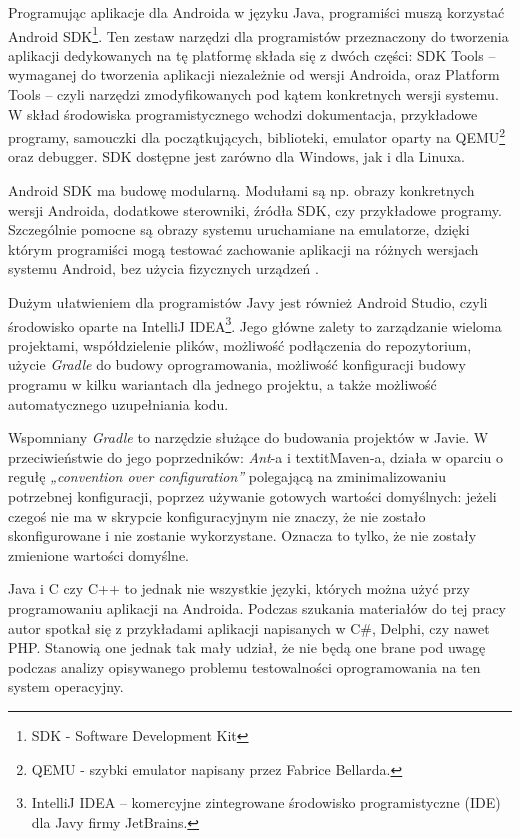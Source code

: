 Programując aplikacje dla Androida w języku Java, programiści muszą korzystać Android SDK\footnote{SDK - Software Development Kit}. Ten zestaw narzędzi dla programistów przeznaczony do tworzenia aplikacji dedykowanych na tę platformę składa się z dwóch części: SDK Tools – wymaganej do tworzenia aplikacji niezależnie od wersji Androida, oraz Platform Tools – czyli narzędzi zmodyfikowanych pod kątem konkretnych wersji systemu. W skład środowiska programistycznego wchodzi dokumentacja, przykładowe programy, samouczki dla początkujących, biblioteki, emulator oparty na QEMU\footnote{QEMU - szybki emulator napisany przez Fabrice Bellarda.} oraz debugger. SDK dostępne jest zarówno dla Windows, jak i dla Linuxa.

Android SDK ma budowę modularną. Modułami są np. obrazy konkretnych wersji Androida, dodatkowe sterowniki, źródła SDK, czy przykładowe programy. Szczególnie pomocne są obrazy systemu uruchamiane na emulatorze, dzięki którym programiści mogą  testować zachowanie aplikacji na różnych wersjach systemu Android, bez użycia fizycznych urządzeń \cite{website:android:sdk}.

Dużym ułatwieniem dla programistów Javy jest również Android Studio, czyli środowisko oparte na IntelliJ IDEA\footnote{IntelliJ IDEA – komercyjne zintegrowane środowisko programistyczne (IDE) dla Javy firmy JetBrains.}. Jego główne zalety to zarządzanie wieloma projektami, współdzielenie plików, możliwość podłączenia do repozytorium, użycie \textit{Gradle} do budowy oprogramowania, możliwość konfiguracji budowy programu w kilku wariantach dla jednego projektu, a także możliwość automatycznego uzupełniania kodu.

Wspomniany \textit{Gradle} to narzędzie służące do budowania projektów w Javie. W przeciwieństwie do jego poprzedników: \textit{Ant}-a i textit{Maven}-a, działa w oparciu o regułę \textit{„convention over configuration”} polegającą na zminimalizowaniu potrzebnej konfiguracji, poprzez używanie gotowych wartości domyślnych: jeżeli czegoś nie ma w skrypcie konfiguracyjnym nie znaczy, że nie zostało skonfigurowane i nie zostanie wykorzystane. Oznacza to tylko, że nie zostały zmienione wartości domyślne.

Java i C czy C++ to jednak nie wszystkie języki, których można użyć przy programowaniu aplikacji na Androida. Podczas szukania materiałów do tej pracy autor spotkał się z przykładami aplikacji napisanych w C\#, Delphi, czy nawet PHP. Stanowią one jednak tak mały udział, że nie będą one brane pod uwagę podczas analizy opisywanego problemu testowalności oprogramowania na ten system operacyjny.


